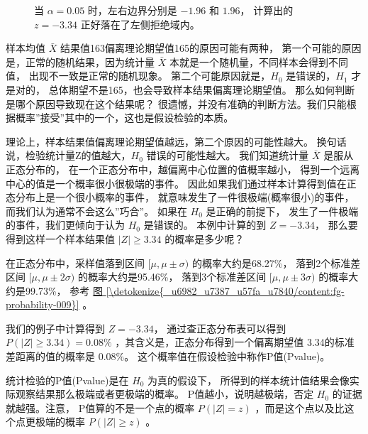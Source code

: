 \documentclass[letterpaper,10pt,english]{sphinxmanual}
\begin{document}
\begin{figure}[htbp]
\centering
\capstart

\noindent{}
\caption{当 \(\alpha=0.05\) 时，左右边界分别是 \(-1.96\) 和 \(1.96\)，
计算出的 \(z=-3.34\) 正好落在了左侧拒绝域内。}\label{\detokenize{_u63a8_u65ad_u4e0e_u68c0_u9a8c/content:id31}}\label{\detokenize{_u63a8_u65ad_u4e0e_u68c0_u9a8c/content:pic-influence-093}}\end{figure}


样本均值 \(\bar{X}\) 结果值163偏离理论期望值165的原因可能有两种，
第一个可能的原因是，正常的随机结果，因为统计量 \(\bar{X}\) 本就是一个随机量，不同样本会得到不同值，
出现不一致是正常的随机现象。
第二个可能原因就是，\(H_0\) 是错误的，\(H_1\) 才是对的，
总体期望不是165，也会导致样本结果偏离理论期望值。
那么如何判断是哪个原因导致现在这个结果呢？
很遗憾，并没有准确的判断方法。我们只能根据概率”接受”其中的一个，这也是假设检验的本质。

理论上，样本结果值偏离理论期望值越远，第二个原因的可能性越大。
换句话说，检验统计量Z的值越大，\(H_0\) 错误的可能性越大。
我们知道统计量 \(\bar{X}\) 是服从正态分布的，
在一个正态分布中，越偏离中心位置的值概率越小，
得到一个远离中心的值是一个概率很小很极端的事件。
因此如果我们通过样本计算得到值在正态分布上是一个很小概率的事件，
就意味发生了一件很极端(概率很小)的事件，
而我们认为通常不会这么”巧合”。
如果在 \(H_0\) 是正确的前提下，
发生了一件极端的事件，我们更倾向于认为 \(H_0\) 是错误的。
本例中计算的到 \(Z=-3.34\)，
那么要得到这样一个样本结果值 \(|Z| \ge 3.34\) 的概率是多少呢？

在正态分布中，采样值落到区间 \([\mu, \mu \pm \sigma)\) 的概率大约是68.27\%，
落到2个标准差区间 \([\mu, \mu \pm 2\sigma)\) 的概率大约是95.46\%，
落到3个标准差区间 \([\mu, \mu \pm 3\sigma)\) 的概率大约是99.73\%，
参考 \hyperref[\detokenize{_u6982_u7387_u57fa_u7840/content:fg-probability-009}]{图 \ref{\detokenize{_u6982_u7387_u57fa_u7840/content:fg-probability-009}}} 。

我们的例子中计算得到 \(Z=-3.34\)，
通过查正态分布表可以得到 \(P(|Z| \ge 3.34)=0.08\%\)
，其含义是，正态分布得到一个偏离期望值  3.34的标准差距离的值的概率是 \(0.08\%\)。
这个概率值在假设检验中称作P值(P\sphinxhyphen{}value)。

\begin{sphinxShadowBox}

统计检验的P值(P\sphinxhyphen{}value)是在 \(H_0\) 为真的假设下，
所得到的样本统计值结果会像实际观察结果那么极端或者更极端的概率。
P值越小，说明越极端，否定 \(H_0\) 的证据就越强。注意，
P值算的不是一个点的概率 \(P(|Z|=z)\) ，而是这个点以及比这个点更极端的概率
\(P(|Z| \ge z)\) 。
\end{sphinxShadowBox}
\end{document}

